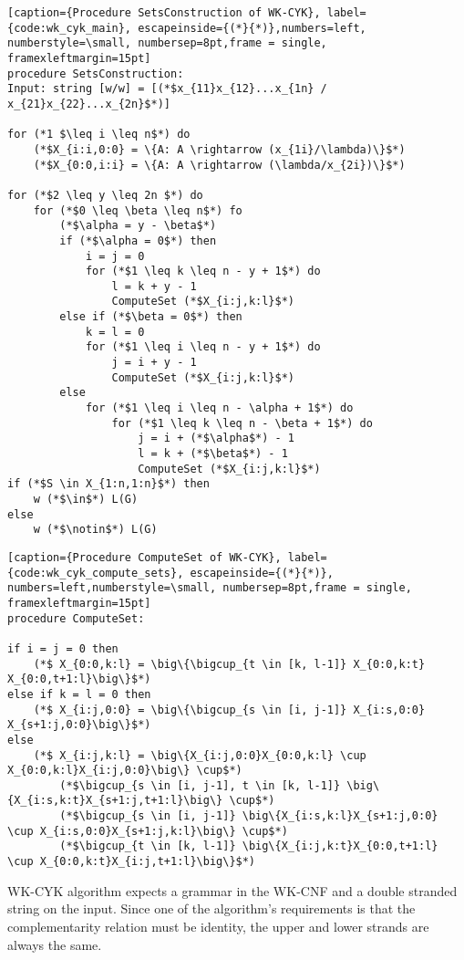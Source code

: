 \begin{lstlisting}[caption={Procedure SetsConstruction of WK-CYK}, label={code:wk_cyk_main}, escapeinside={(*}{*)},numbers=left,
numberstyle=\small, numbersep=8pt,frame = single, framexleftmargin=15pt]
procedure SetsConstruction:
Input: string [w/w] = [(*$x_{11}x_{12}...x_{1n} / x_{21}x_{22}...x_{2n}$*)]

for (*1 $\leq i \leq n$*) do
    (*$X_{i:i,0:0} = \{A: A \rightarrow (x_{1i}/\lambda)\}$*)
    (*$X_{0:0,i:i} = \{A: A \rightarrow (\lambda/x_{2i})\}$*)

for (*$2 \leq y \leq 2n $*) do
    for (*$0 \leq \beta \leq n$*) fo
        (*$\alpha = y - \beta$*)
        if (*$\alpha = 0$*) then
            i = j = 0
            for (*$1 \leq k \leq n - y + 1$*) do
                l = k + y - 1
                ComputeSet (*$X_{i:j,k:l}$*)
        else if (*$\beta = 0$*) then
            k = l = 0
            for (*$1 \leq i \leq n - y + 1$*) do
                j = i + y - 1
                ComputeSet (*$X_{i:j,k:l}$*)
        else
            for (*$1 \leq i \leq n - \alpha + 1$*) do
                for (*$1 \leq k \leq n - \beta + 1$*) do
                    j = i + (*$\alpha$*) - 1
                    l = k + (*$\beta$*) - 1
                    ComputeSet (*$X_{i:j,k:l}$*)
if (*$S \in X_{1:n,1:n}$*) then
    w (*$\in$*) L(G)
else
    w (*$\notin$*) L(G)
\end{lstlisting}

\begin{lstlisting}[caption={Procedure ComputeSet of WK-CYK}, label={code:wk_cyk_compute_sets}, escapeinside={(*}{*)},
numbers=left,numberstyle=\small, numbersep=8pt,frame = single, framexleftmargin=15pt]
procedure ComputeSet:

if i = j = 0 then
    (*$ X_{0:0,k:l} = \big\{\bigcup_{t \in [k, l-1]} X_{0:0,k:t} X_{0:0,t+1:l}\big\}$*)
else if k = l = 0 then
    (*$ X_{i:j,0:0} = \big\{\bigcup_{s \in [i, j-1]} X_{i:s,0:0} X_{s+1:j,0:0}\big\}$*)
else
    (*$ X_{i:j,k:l} = \big\{X_{i:j,0:0}X_{0:0,k:l} \cup X_{0:0,k:l}X_{i:j,0:0}\big\} \cup$*)
        (*$\bigcup_{s \in [i, j-1], t \in [k, l-1]} \big\{X_{i:s,k:t}X_{s+1:j,t+1:l}\big\} \cup$*)
        (*$\bigcup_{s \in [i, j-1]} \big\{X_{i:s,k:l}X_{s+1:j,0:0} \cup X_{i:s,0:0}X_{s+1:j,k:l}\big\} \cup$*)
        (*$\bigcup_{t \in [k, l-1]} \big\{X_{i:j,k:t}X_{0:0,t+1:l} \cup X_{0:0,k:t}X_{i:j,t+1:l}\big\}$*)
\end{lstlisting}


WK-CYK algorithm expects a grammar in the WK-CNF and a double stranded string on the input. Since one of the algorithm's requirements is that the complementarity relation must be identity, the upper and lower strands are always the same.

